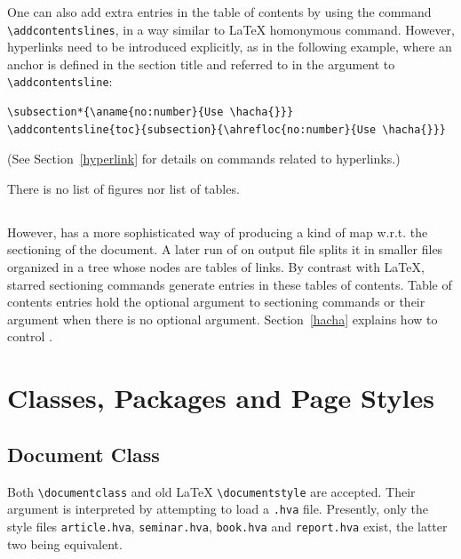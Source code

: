 One can also add extra entries in the table of contents by using
the command \verb+\addcontentslines+, in a way similar
to \LaTeX{} homonymous command.
However, hyperlinks need to be introduced explicitly,
as in the following example, where
an anchor is defined in the section title and referred to in the
argument to \verb+\addcontentsline+:
\begin{verbatim}
\subsection*{\aname{no:number}{Use \hacha{}}}
\addcontentsline{toc}{subsection}{\ahrefloc{no:number}{Use \hacha{}}}
\end{verbatim}
(See Section~\ref{hyperlink} for details on commands related to hyperlinks.)

There is no list of figures nor list of tables.

\subsection*{}
However, \hevea{} has a more sophisticated way of producing
a kind of map w.r.t. the sectioning of the document.
A later run of {\hacha} on \hevea{} output file splits it
in smaller files organized in a tree whose nodes are tables of
links.
By contrast with \LaTeX{}, starred sectioning commands generate
entries in these tables of contents.
Table of contents entries hold the optional argument to sectioning
commands or their argument when there is no optional
argument. Section~\ref{hacha} explains how to
control {\hacha}.

\section{Classes, Packages and Page Styles}

\subsection{Document Class}
Both \LaTeXe{} \verb+\documentclass+ and old \LaTeX{}
\verb+\documentstyle+ are accepted.
Their argument  is interpreted by attempting to load a
\texttt{.hva} file.
Presently, only the style files \texttt{article.hva}, \texttt{seminar.hva},
\texttt{book.hva} and \texttt{report.hva} exist, the latter two
being equivalent.

